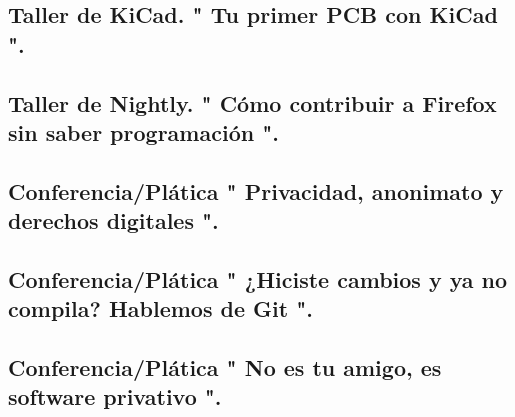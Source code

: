 \documentclass[a4paper,11pt]{article}                 %
\begin{document}
  \subsection{Taller de KiCad. " Tu primer PCB con KiCad ".}     
  \subsection{Taller de Nightly. " {Cómo} contribuir a Firefox sin saber programación ".}  
  \subsection{Conferencia/Plática " Privacidad, anonimato y derechos digitales ".}     
  \subsection{Conferencia/Plática " ¿Hiciste cambios y ya no compila? Hablemos de Git ".} 
  \subsection{Conferencia/Plática " No es tu amigo, es software privativo ".}  
   
  


\end{document}
